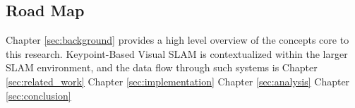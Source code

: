 \subsection{Road Map}

Chapter \ref{sec:background} provides a high level overview of the concepts core to this research. Keypoint-Based Visual SLAM is contextualized within the larger SLAM environment, and the data flow through such systems is 
Chapter \ref{sec:related_work}
Chapter \ref{sec:implementation}
Chapter \ref{sec:analysis}
Chapter \ref{sec:conclusion}